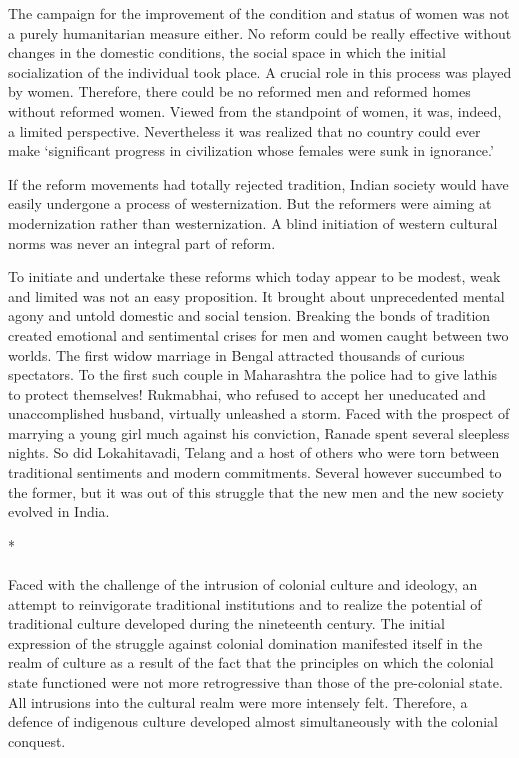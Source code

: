 The campaign for the improvement of the condition and status of women was not a purely humanitarian measure either. No reform could be really effective without changes in the domestic conditions, the social space in which the initial socialization of the individual took place. A crucial role in this process was played by women. Therefore, there could be no reformed men and reformed homes without reformed women. Viewed from the standpoint of women, it was, indeed, a limited perspective. Nevertheless it was realized that no country could ever make `significant progress in civilization whose females were sunk in ignorance.'

If the reform movements had totally rejected tradition, Indian society would have easily undergone a process of westernization. But the reformers were aiming at modernization rather than westernization. A blind initiation of western cultural norms was never an integral part of reform.

To initiate and undertake these reforms which today appear to be modest, weak and limited was not an easy proposition. It brought about unprecedented mental agony and untold domestic and social tension. Breaking the bonds of tradition created emotional and sentimental crises for men and women caught between two worlds. The first widow marriage in Bengal attracted thousands of curious spectators. To the first such couple in Maharashtra the police had to give lathis to protect themselves! Rukmabhai, who refused to accept her uneducated and unaccomplished husband, virtually unleashed a storm. Faced with the prospect of marrying a young girl much against his conviction, Ranade spent several sleepless nights. So did Lokahitavadi, Telang and a host of others who were torn between traditional sentiments and modern commitments. Several however succumbed to the former, but it was out of this struggle that the new men and the new society evolved in India.

\begin{center}*\end{center}

\paragraph*{}


Faced with the challenge of the intrusion of colonial culture and ideology, an attempt to reinvigorate traditional institutions and to realize the potential of traditional culture developed during the nineteenth century. The initial expression of the struggle against colonial domination manifested itself in the realm of culture as a result of the fact that the principles on which the colonial state functioned were not more retrogressive than those of the pre-colonial state. All intrusions into the cultural realm were more intensely felt. Therefore, a defence of indigenous culture developed almost simultaneously with the colonial conquest.


